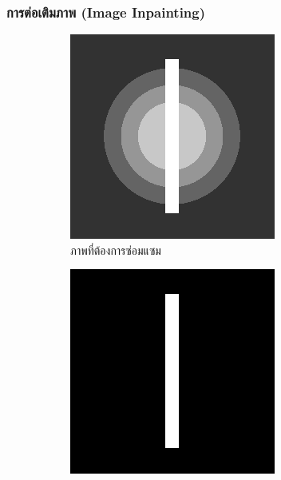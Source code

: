 \documentclass[xcolor=dvipsnames, xetex,serif]{beamer}
\numberwithin{equation}{section}
\begin{document}
		\begin{frame}
		\frametitle{การต่อเติมภาพ (Image Inpainting)} 
			\begin{figure}[H]
				\centering
				\begin{subfigure}{0.3\linewidth}
					\centering
					\includegraphics[width=0.8\linewidth]{images/grayscale_inpaint/toinpaint.png}
					\caption{ภาพที่ต้องการซ่อมแซม}
				\end{subfigure}
				\begin{subfigure}{0.3\linewidth}
					\centering
					\includegraphics[width=0.8\linewidth]{images/grayscale_inpaint/inpaintdomain.png}

\end{subfigure}
\end{figure}
\end{frame}
\end{document}
